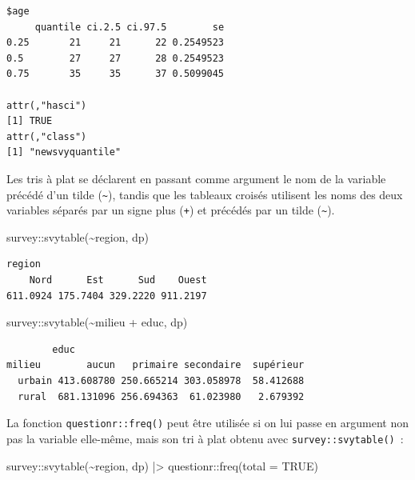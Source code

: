\documentclass[
  letterpaper,
  DIV=11,
  numbers=noendperiod,
  oneside]{scrreprt}
\newenvironment{Shaded}{\begin{snugshade}}{\end{snugshade}}
\newcommand{\AttributeTok}[1]{\textcolor[rgb]{0.40,0.45,0.13}{#1}}
\newcommand{\ConstantTok}[1]{\textcolor[rgb]{0.56,0.35,0.01}{#1}}
\newcommand{\FunctionTok}[1]{\textcolor[rgb]{0.28,0.35,0.67}{#1}}
\newcommand{\NormalTok}[1]{\textcolor[rgb]{0.00,0.23,0.31}{#1}}
\newcommand{\SpecialCharTok}[1]{\textcolor[rgb]{0.37,0.37,0.37}{#1}}
\begin{document}
\begin{verbatim}
$age
     quantile ci.2.5 ci.97.5        se
0.25       21     21      22 0.2549523
0.5        27     27      28 0.2549523
0.75       35     35      37 0.5099045

attr(,"hasci")
[1] TRUE
attr(,"class")
[1] "newsvyquantile"
\end{verbatim}

Les tris à plat se déclarent en passant comme argument le nom de la
variable précédé d'un tilde (\texttt{\textasciitilde{}}), tandis que les
tableaux croisés utilisent les noms des deux variables séparés par un
signe plus (\texttt{+}) et précédés par un tilde
(\texttt{\textasciitilde{}}).

\begin{Shaded}
\begin{Highlighting}[]
\NormalTok{survey}\SpecialCharTok{::}\FunctionTok{svytable}\NormalTok{(}\SpecialCharTok{\textasciitilde{}}\NormalTok{region, dp)}
\end{Highlighting}
\end{Shaded}

\begin{verbatim}
region
    Nord      Est      Sud    Ouest 
611.0924 175.7404 329.2220 911.2197 
\end{verbatim}

\begin{Shaded}
\begin{Highlighting}[]
\NormalTok{survey}\SpecialCharTok{::}\FunctionTok{svytable}\NormalTok{(}\SpecialCharTok{\textasciitilde{}}\NormalTok{milieu }\SpecialCharTok{+}\NormalTok{ educ, dp)}
\end{Highlighting}
\end{Shaded}

\begin{verbatim}
        educ
milieu        aucun   primaire secondaire  supérieur
  urbain 413.608780 250.665214 303.058978  58.412688
  rural  681.131096 256.694363  61.023980   2.679392
\end{verbatim}

La fonction \texttt{questionr::freq()} peut être utilisée si on lui
passe en argument non pas la variable elle-même, mais son tri à plat
obtenu avec \texttt{survey::svytable()}~:

\begin{Shaded}
\begin{Highlighting}[]
\NormalTok{survey}\SpecialCharTok{::}\FunctionTok{svytable}\NormalTok{(}\SpecialCharTok{\textasciitilde{}}\NormalTok{region, dp) }\SpecialCharTok{|\textgreater{}} 
\NormalTok{  questionr}\SpecialCharTok{::}\FunctionTok{freq}\NormalTok{(}\AttributeTok{total =} \ConstantTok{TRUE}\NormalTok{)}
\end{Highlighting}
\end{Shaded}
\end{document}
